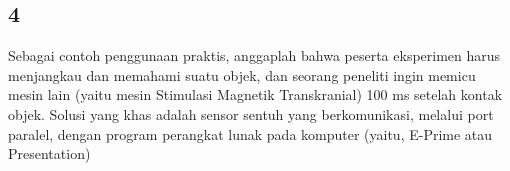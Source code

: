 \subsection{4}
	Sebagai contoh penggunaan praktis, anggaplah bahwa peserta eksperimen harus menjangkau dan memahami suatu objek, dan seorang peneliti ingin memicu mesin lain (yaitu mesin Stimulasi Magnetik Transkranial) 100 ms setelah kontak objek. Solusi yang khas adalah sensor sentuh yang berkomunikasi, melalui port paralel, dengan program perangkat lunak pada komputer (yaitu, E-Prime atau Presentation)